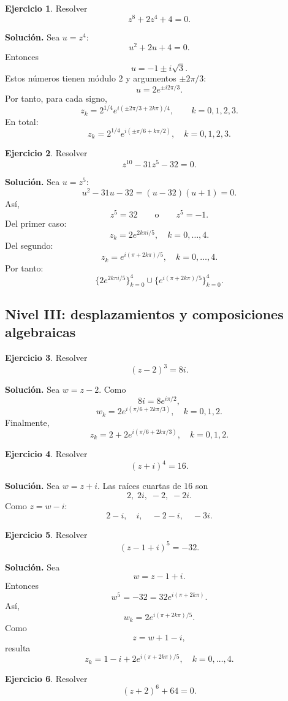 \documentclass[12pt]{article}
\theoremstyle{definition}
\newtheorem{ejercicio}{Ejercicio}[section]
\theoremstyle{remark}
\begin{document}
\begin{ejercicio}
Resolver
\[
z^8+2z^4+4=0.
\]
\end{ejercicio}

\textbf{Solución.}
Sea $u=z^4$:
\[
u^2+2u+4=0.
\]
Entonces
\[
u=-1\pm i\sqrt3.
\]
Estos números tienen módulo $2$ y argumentos $\pm2\pi/3$:
\[
u=2e^{\pm i2\pi/3}.
\]
Por tanto, para cada signo,
\[
z_k=2^{1/4}
e^{i(\pm2\pi/3+2k\pi)/4},
\qquad k=0,1,2,3.
\]
En total:
\[
\boxed{
z_k=2^{1/4}e^{i(\pm\pi/6+k\pi/2)},
\quad k=0,1,2,3.
}
\]

\begin{ejercicio}
Resolver
\[
z^{10}-31z^5-32=0.
\]
\end{ejercicio}

\textbf{Solución.}
Sea $u=z^5$:
\[
u^2-31u-32=(u-32)(u+1)=0.
\]
Así,
\[
z^5=32\qquad\text{o}\qquad z^5=-1.
\]
Del primer caso:
\[
z_k=2e^{2k\pi i/5},\quad k=0,\ldots,4.
\]
Del segundo:
\[
z_k=e^{i(\pi+2k\pi)/5},\quad k=0,\ldots,4.
\]
Por tanto:
\[
\boxed{
\{2e^{2k\pi i/5}\}_{k=0}^4
\cup
\{e^{i(\pi+2k\pi)/5}\}_{k=0}^4.
}
\]

\subsection{Nivel III: desplazamientos y composiciones algebraicas}

\begin{ejercicio}
Resolver
\[
(z-2)^3=8i.
\]
\end{ejercicio}

\textbf{Solución.}
Sea $w=z-2$. Como
\[
8i=8e^{i\pi/2},
\]
\[
w_k=2e^{i(\pi/6+2k\pi/3)},\quad k=0,1,2.
\]
Finalmente,
\[
\boxed{
z_k=2+2e^{i(\pi/6+2k\pi/3)},\quad k=0,1,2.
}
\]

\begin{ejercicio}
Resolver
\[
(z+i)^4=16.
\]
\end{ejercicio}

\textbf{Solución.}
Sea $w=z+i$. Las raíces cuartas de $16$ son
\[
2,\;2i,\;-2,\;-2i.
\]
Como $z=w-i$:
\[
\boxed{
2-i,\quad i,\quad -2-i,\quad -3i.
}
\]

\begin{ejercicio}
Resolver
\[
(z-1+i)^5=-32.
\]
\end{ejercicio}

\textbf{Solución.}
Sea
\[
w=z-1+i.
\]
Entonces
\[
w^5=-32=32e^{i(\pi+2k\pi)}.
\]
Así,
\[
w_k=2e^{i(\pi+2k\pi)/5}.
\]
Como
\[
z=w+1-i,
\]
resulta
\[
\boxed{
z_k=1-i+2e^{i(\pi+2k\pi)/5},
\quad k=0,\ldots,4.
}
\]

\begin{ejercicio}
Resolver
\[
(z+2)^6+64=0.
\]
\end{ejercicio}
\end{document}
